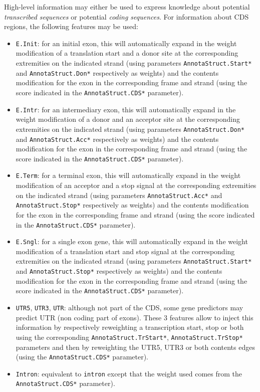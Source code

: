 High-level information may either be used to express knowledge about
potential \emph{transcribed sequences} or potential \emph{coding
  sequences}. For information about CDS regions, the following
features may be used:
\begin{itemize}
\item \texttt{E.Init}: for an initial exon, this will automatically
  expand in the weight modification of a translation start and a donor
  site at the corresponding extremities on the indicated strand (using
  parameters \texttt{AnnotaStruct.Start*} and
  \texttt{AnnotaStruct.Don*} respectively as weights) and the contents
  modification for the exon in the corresponding frame and strand
  (using the score indicated in the \texttt{AnnotaStruct.CDS*}
  parameter).
\item \texttt{E.Intr}: for an intermediary exon, this will
  automatically expand in the weight modification of a donor and an
  acceptor site at the corresponding extremities on the indicated
  strand (using parameters \texttt{AnnotaStruct.Don*} and
  \texttt{AnnotaStruct.Acc*} respectively as weights) and the contents
  modification for the exon in the corresponding frame and strand
  (using the score indicated in the \texttt{AnnotaStruct.CDS*}
  parameter).
\item \texttt{E.Term}: for a terminal exon, this will automatically
  expand in the weight modification of an acceptor and a stop signal
  at the corresponding extremities on the indicated strand (using
  parameters \texttt{AnnotaStruct.Acc*} and \texttt{AnnotaStruct.Stop*}
  respectively as weights) and the contents modification for the exon
  in the corresponding frame and strand (using the score indicated in
  the \texttt{AnnotaStruct.CDS*} parameter).
\item \texttt{E.Sngl}: for a single exon gene, this will automatically
  expand in the weight modification of a translation start and stop
  signal at the corresponding extremities on the indicated strand
  (using parameters \texttt{AnnotaStruct.Start*} and
  \texttt{AnnotaStruct.Stop*} respectively as weights) and the
  contents modification for the exon in the corresponding frame and
  strand (using the score indicated in the \texttt{AnnotaStruct.CDS*}
  parameter).
\item \texttt{UTR5}, \texttt{UTR3}, \texttt{UTR}: although not part of
  the CDS, some gene predictors may predict UTR (non coding part of
  exons). These 3 features allow to inject this information by
  respectively reweighting a transcription start, stop or both using
  the corresponding \texttt{AnnotaStruct.TrStart*},
  \texttt{Annota\-Struct.TrStop*} parameters and then by reweighting the
  UTR5, UTR3 or both contents edges (using the
  \texttt{AnnotaStruct.CDS*} parameter).
\item \texttt{Intron}: equivalent to \texttt{intron} except that the
  weight used comes from the \texttt{AnnotaStruct.CDS*} parameter). 
\end{itemize}


